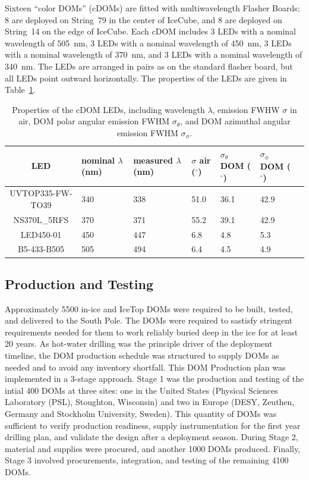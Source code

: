 Sixteen ``color DOMs'' (cDOMs) are fitted with multiwavelength
Flasher Boards; 8 are deployed on String~79 in the center of IceCube, and 8
are deployed on String~14 on the edge of IceCube.  Each cDOM includes 3 LEDs with a nominal
wavelength of 505~nm, 3 LEDs with a nominal wavelength of 450~nm, 3
LEDs with a nominal wavelength of 370~nm, and 3 LEDs with a nominal
wavelength of 340~nm. The LEDs are arranged in pairs as on the
standard flasher board, but all LEDs point outward horizontally. 
The properties of the LEDs are given in
Table~\ref{table:cdom_properties}.

\begin{table}
\caption{Properties of the cDOM LEDs, including wavelength $\lambda$,
  emission FWHW $\sigma$ in air, DOM polar
  angular emission FWHM $\sigma_{\theta}$, and DOM azimuthal angular emission
  FWHM $\sigma_{\phi}$.}
\begin{tabularx}{\linewidth}{|c|X|X|X|X|X|X|}
  \hline
 LED& nominal $\lambda$ (nm) & measured $\lambda$ (nm) & $\sigma$ air ($^{\circ}$) &
 $\sigma_{\theta}$ DOM ($^{\circ}$) & $\sigma_{\phi}$ DOM ($^{\circ}$)\\
\hline
UVTOP335-FW-TO39 & 340 & 338 & 51.0 & 36.1 & 42.9 \\
\hline
NS370L\_5RFS & 370 & 371 & 55.2 & 39.1 & 42.9 \\
\hline
LED450-01 & 450 & 447 &	6.8 & 4.8 &	5.3 \\
\hline
B5-433-B505 & 505 & 494 & 6.4 &	4.5 & 4.9 \\
\hline
\end{tabularx}
\label{table:cdom_properties}
\end{table}

\subsection{\label{sec:dom_prodtest} Production and Testing}

Approximately 5500 in-ice and IceTop DOMs were required to be built, tested,
and delivered to the South Pole.  The DOMs were required to sastisfy
stringent requirements needed for them to work reliably buried deep
in the ice for at least 20 years.  As hot-water drilling was the principle
driver of the deployment timeline, the DOM production schedule was
structured to supply DOMs as needed and to avoid any inventory shortfall.
This DOM Production plan was implemented in a 3-stage approach. Stage 1 was
the production and testing of the intial 400 DOMs at three sites: one in the United
States (Physical Sciences Laboratory (PSL), Stoughton, Wisconsin) and two
in Europe (DESY, Zeuthen, Germany and Stockholm University, Sweden).  This
quantity of DOMs was sufficient to verify production readiness, supply
instrumentation for the first year drilling plan, and validate the design after a deployment
season.  During Stage 2, material and supplies were procured, and another
1000 DOMs produced. Finally, Stage 3 involved procurements,
integration, and testing of the remaining 4100 DOMs.

